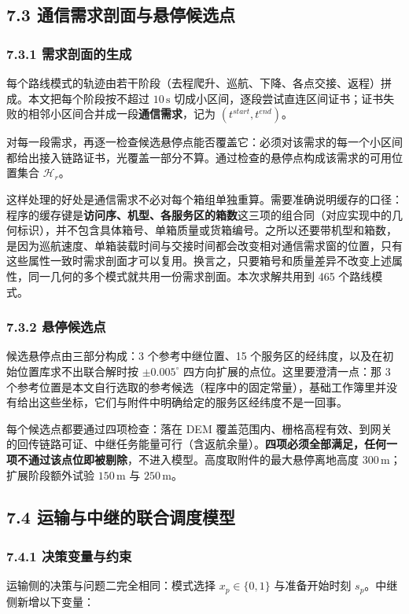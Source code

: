 \documentclass[withoutpreface,bwprint]{format}
\begin{document}
\subsection{7.3 通信需求剖面与悬停候选点}

\subsubsection{7.3.1 需求剖面的生成}
每个路线模式的轨迹由若干阶段（去程爬升、巡航、下降、各点交接、返程）拼成。本文把每个阶段按不超过 $10\,\text{s}$ 切成小区间，逐段尝试直连区间证书；证书失败的相邻小区间合并成一段\textbf{通信需求}，记为 $(t^{start}, t^{end})$。

对每一段需求，再逐一检查候选悬停点能否覆盖它：必须对该需求的每一个小区间都给出接入链路证书，光覆盖一部分不算。通过检查的悬停点构成该需求的可用位置集合 $\mathcal{H}_r$。

这样处理的好处是通信需求不必对每个箱组单独重算。需要准确说明缓存的口径：程序的缓存键是\textbf{访问序、机型、各服务区的箱数}这三项的组合同（对应实现中的几何标识），并不包含具体箱号、单箱质量或货箱编号。之所以还要带机型和箱数，是因为巡航速度、单箱装载时间与交接时间都会改变相对通信需求窗的位置，只有这些属性一致时需求剖面才可以复用。换言之，只要箱号和质量差异不改变上述属性，同一几何的多个模式就共用一份需求剖面。本次求解共用到 465 个路线模式。

\subsubsection{7.3.2 悬停候选点}
候选悬停点由三部分构成：3 个参考中继位置、15 个服务区的经纬度，以及在初始位置库求不出联合解时按 $\pm 0.005^\circ$ 四方向扩展的点位。这里要澄清一点：那 3 个参考位置是本文自行选取的参考候选（程序中的固定常量），基础工作簿里并没有给出这些坐标，它们与附件中明确给定的服务区经纬度不是一回事。

每个候选点都要通过四项检查：落在 DEM 覆盖范围内、栅格高程有效、到网关的回传链路可证、中继任务能量可行（含返航余量）。\textbf{四项必须全部满足，任何一项不通过该点位即被剔除}，不进入模型。高度取附件的最大悬停离地高度 $300\,\text{m}$；扩展阶段额外试验 $150\,\text{m}$ 与 $250\,\text{m}$。

\subsection{7.4 运输与中继的联合调度模型}

\subsubsection{7.4.1 决策变量与约束}
运输侧的决策与问题二完全相同：模式选择 $x_p \in \{0,1\}$ 与准备开始时刻 $s_p$。中继侧新增以下变量：
\end{document}
